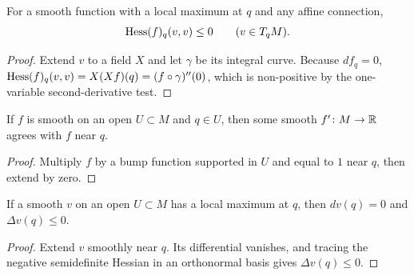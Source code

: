 \begin{lemma}
\label{lem:hessian-nonpositive-at-max}




For a smooth function with a local maximum at $q$ and any affine
connection,
$$\operatorname{Hess}(f)_q(v,v)\le0\qquad(v\in T_qM).$$
\end{lemma}
\begin{proof}
\sketch

Extend $v$ to a field $X$ and let $\gamma$ be its integral curve.
Because $df_q=0$,
$\operatorname{Hess}(f)_q(v,v)=X(Xf)(q)=(f\circ\gamma)''(0)$, which is non-positive
by the one-variable second-derivative test.
\end{proof}

\begin{lemma}
\label{lem:smooth-local-extension}



If $f$ is smooth on an open $U\subset M$ and $q\in U$, then some smooth
$f'\colon M\to\mathbb{R}$ agrees with $f$ near $q$.
\end{lemma}
\begin{proof}
\sketch

Multiply $f$ by a bump function supported in $U$ and equal to $1$ near
$q$, then extend by zero.
\end{proof}

\begin{lemma}
\label{lem:laplacian-nonpositive-at-max}





If a smooth $v$ on an open $U\subset M$ has a local maximum at $q$, then
$dv(q)=0$ and $\Delta v(q)\le0$.
\end{lemma}
\begin{proof}
\sketch

Extend $v$ smoothly near $q$. Its differential vanishes, and tracing the
negative semidefinite Hessian in an orthonormal basis gives
$\Delta v(q)\le0$.
\end{proof}

